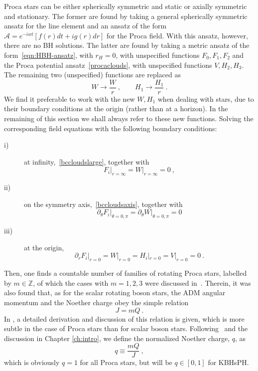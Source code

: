 Proca stars can be either spherically symmetric and static or axially symmetric and stationary. The former are found by taking a general spherically symmetric ansatz for the line element and an ansatz of the form $\mathcal{A}=e^{-iwt}\left[f(r)dt+ig(r)dr \right]$ for the Proca field.
With this ansatz, however, there are no BH solutions\cite{Herdeiro:2016tmi}. The latter are found by taking a metric ansatz of the form~\eqref{eqn:HBH-ansatz}, with $r_H=0$, with unspecified functions $F_0,F_1,F_2$ and the Proca potential ansatz~\eqref{procaclouds}, with unspecified functions $V,H_2,H_3$.
The remaining two (unspecified) functions are replaced as
\begin{equation}
W\rightarrow \frac{{W}}{r} \ , \qquad H_1\rightarrow \frac{{H_1}}{r} \ . 
\label{ww}
\end{equation}
We find it preferable to work with the new ${W},{H_1}$ when dealing with stars, due to their boundary conditions at the origin (rather than at a horizon). In the remaining of this section we shall always refer to these new functions.
Solving the corresponding field equations with the following boundary conditions:
\begin{description}
\item[i)] at infinity,~\eqref{bccloudslarge}, together with
\begin{equation}
F_i\big|_{r=\infty}={W}\big|_{r=\infty}=0 \ , 
\label{bcstarslarge}
\end{equation}
\item[ii)] on the symmetry axis,~\eqref{bccloudsaxis}, together with 
\begin{equation}
 \partial_\theta F_i\big|_{\theta=0,\pi}=\partial_\theta {W}\big|_{\theta=0,\pi}=0
 \label{bcstarsaxis}
 \end{equation}
 \item[iii)] at the origin, 
 \begin{equation}
 \partial_r F_i\big|_{r=0}={W}\big|_{r=0}=H_i|_{r=0}=V|_{r=0}=0 \ .
 \end{equation}
\end{description} 
 Then, one finds a countable number of families of rotating Proca stars, labelled by $m\in \mathbb{Z}$, of which the cases with $m=1,2,3$ were discussed in~\cite{Brito:2015pxa}.  Therein, it was also found that, as for the scalar rotating boson stars, the ADM angular momentum and the Noether charge obey the simple relation 
 \begin{equation}
 J=mQ \ .
\label{amnc}
 \end{equation}
%
In \cite{Herdeiro:2016tmi}, a detailed derivation and discussion of this relation is given, which is more subtle in the case of Proca stars than for scalar boson stars.
Following~\cite{Herdeiro:2014goa} and the discussion in Chapter \ref{ch:intro}, we define the normalized Noether charge, $q$, as 
 \begin{equation}
 q\equiv \frac{mQ}{J} \ ,
 \label{jq}
 \end{equation}
 which is obviously $q=1$ for all Proca stars, but will be $q\in [0,1]$ for KBHsPH.
 
